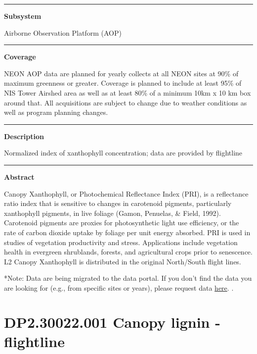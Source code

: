 \documentclass[]{article}
\begin{document}
\begin{center}\rule{0.5\linewidth}{\linethickness}\end{center}

\textbf{Subsystem}

Airborne Observation Platform (AOP)

\begin{center}\rule{0.5\linewidth}{\linethickness}\end{center}

\textbf{Coverage}

NEON AOP data are planned for yearly collects at all NEON sites at 90\%
of maximum greenness or greater. Coverage is planned to include at least
95\% of NIS Tower Airshed area as well as at least 80\% of a minimum
10km x 10 km box around that. All acquisitions are subject to change due
to weather conditions as well as program planning changes.

\begin{center}\rule{0.5\linewidth}{\linethickness}\end{center}

\textbf{Description}

Normalized index of xanthophyll concentration; data are provided by
flightline

\begin{center}\rule{0.5\linewidth}{\linethickness}\end{center}

\textbf{Abstract}

Canopy Xanthophyll, or Photochemical Reflectance Index (PRI), is a
reflectance ratio index that is sensitive to changes in carotenoid
pigments, particularly xanthophyll pigments, in live foliage (Gamon,
Penuelas, \& Field, 1992). Carotenoid pigments are proxies for
photosynthetic light use efficiency, or the rate of carbon dioxide
uptake by foliage per unit energy absorbed. PRI is used in studies of
vegetation productivity and stress. Applications include vegetation
health in evergreen shrublands, forests, and agricultural crops prior to
senescence. L2 Canopy Xanthophyll is distributed in the original
North/South flight lines.

*Note: Data are being migrated to the data portal. If you don't find the
data you are looking for (e.g., from specific sites or years), please
request data
\href{http://www.neonscience.org/request-airborne-data}{here}. \newpage
.

\section{DP2.30022.001 Canopy lignin -
flightline}\label{dp2.30022.001-canopy-lignin---flightline}
\end{document}
